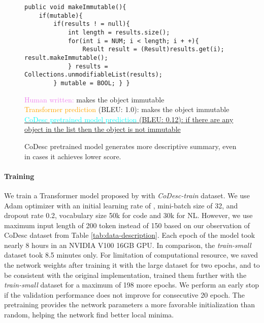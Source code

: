 \documentclass[11pt,a4paper]{article}
\begin{document}
\begin{table}[t]
\centering
\setlength\arrayrulewidth{.6pt}
\caption{Code summarization with \citet{ncs} proposed Transformer network with and without pretraining with CoDesc.}
\label{tab:ncs-results}
\end{table}


\begin{figure*}
\begin{lstlisting}
public void makeImmutable(){ 
	if(mutable){ 
		if(results ! = null){ 
			int length = results.size(); 
			for(int i = NUM; i < length; i + +){ 
				Result result = (Result)results.get(i); result.makeImmutable(); 
			} results = Collections.unmodifiableList(results); 
		} mutable = BOOL; } }
\end{lstlisting}
\vspace{-4pt}
{\small
\renewcommand{\baselinestretch}{.4}
\textcolor{violet}{Human written:} makes the object immutable \\
\textcolor{orange}{Transformer prediction} (BLEU: 1.0): makes the object immutable \\
\uline{\textcolor{cyan}{CoDesc pretrained model prediction} (BLEU: 0.12): if there are any object in the list then the object is not immutable \hfill}
}
\caption{CoDesc pretrained model generates more descriptive summary, even in cases it achieves lower score.}
\label{fig:sample-data}
\end{figure*}



\paragraph{Training} 
We train a Transformer model proposed by \citet{ncs} with \textit{CoDesc-train} dataset. We use Adam optimizer with an initial learning rate of , mini-batch size of 32, and dropout rate 0.2, vocabulary size 50k for code and 30k for NL. However, we use maximum input length of 200 token instead of 150 based on our observation of CoDesc dataset from Table \ref{tab:data-description}. Each epoch of the model took nearly 8 hours in an NVIDIA V100 16GB GPU. In comparison, the \textit{train-small} dataset took 8.5 minutes only. For limitation of computational resource, we saved the network weights after training it with the large dataset for two epochs, and to be consistent with the original implementation, trained them further with the \textit{train-small} dataset for a maximum of 198 more epochs. We perform an early stop if the validation performance does not improve for consecutive 20 epoch. The pretraining provides the network parameters a more favorable initialization than random, helping the network find better local minima.
\end{document}
